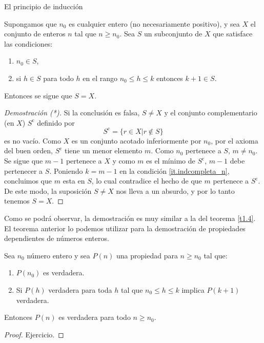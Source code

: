 \begin{section}{El principio de inducción}
\begin{teorema} Supongamos que $n_0$ es cualquier entero (no necesariamente positivo), y sea $X$ el conjunto de enteros $n$ tal que $ n \ge n_0$. Sea $S$ un subconjunto de $X$ que satisface las condiciones: 
\begin{enumerate}[label=\textit{\alph*)}]
\item\label{it.indcompleta_1} $n_0 \in S$,
\item\label{it.indcompleta_n} si $h\in S$ para todo $h$ en el rango $n_0 \le h \le k$ entonces $k+1 \in S$.
\end{enumerate}
Entonces se sigue que $S=X$.
\end{teorema}
\begin{proof}[Demostración (*)]
Si la conclusión es falsa, $S \not= X$ y el conjunto complementario (en $X$)  $S^{\text{c}}$ definido por
$$
S^{\text{c}}= \{ r \in X | r\not\in S\}
$$
es no vacío. Como $X$ es un conjunto acotado inferiormente por $n_0$, por el axioma del buen orden, $S^{\text{c}}$ tiene un menor elemento $m$. Como $n_0$ pertenece a $S$, $m\not=n_0$. Se sigue que $m-1$ pertenece a $X$ y como $m$ es el mínimo de $S^{\text{c}}$, $m-1$ debe pertenecer a $S$. Poniendo $k=m-1$ en la condición \ref{it.indcompleta_n}, concluimos que $m$ esta en $S$, lo cual contradice el hecho de que $m$ pertenece a $S^{\text{c}}$. De este modo, la suposición $S \not= X$ nos lleva a un absurdo, y por lo tanto tenemos $S= X$.
\end{proof}

Como se podrá observar, la demostración es muy similar a  la del teorema \ref{t1.4}. El teorema anterior lo podemos utilizar para la demostración de propiedades dependientes de números enteros.

\begin{teorema}\label{ind-completa} Sea $n_0$ número entero y sea $P(n)$ una propiedad para $n \ge n_0$ tal que:
\begin{enumerate}[label=\textit{\alph*)}]
\item $P(n_0)$ es verdadera.
\item Si $P(h)$ verdadera para toda $h$ tal que $n_0 \le h \le k$ implica $P(k + 1)$ verdadera.
\end{enumerate}
Entonces $P(n)$ es verdadera para todo $n \ge n_0$.
\end{teorema}
\begin{proof} Ejercicio.
\end{proof}




\end{section}
